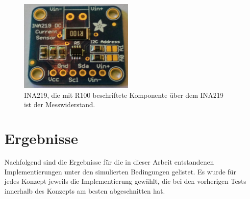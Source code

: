\begin{figure}[h]
  \centering
	\includegraphics[width=0.5\textwidth]{images/ina219.jpg}
  \caption{INA219, die mit R100 beschriftete Komponente über dem INA219 ist der Messwiderstand.}
  \label{fig:ina219}
\end{figure}

\section{Ergebnisse}
Nachfolgend sind die Ergebnisse für die in dieser Arbeit entstandenen Implementierungen unter den simulierten Bedingungen gelistet.
Es wurde für jedes Konzept jeweils die Implementierung gewählt, die bei den vorherigen Tests innerhalb des Konzepts am besten abgeschnitten hat.\\


